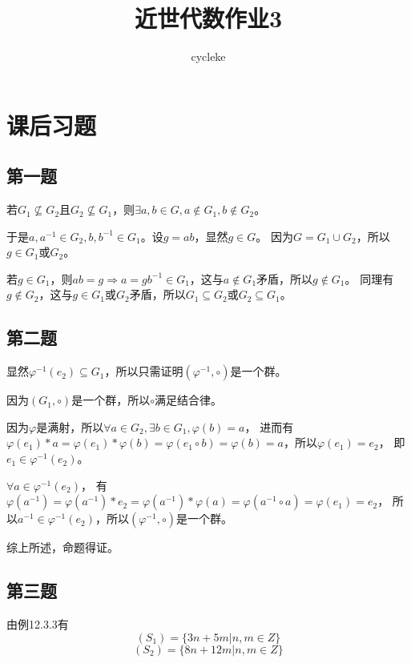 \documentclass[12pt,onecolumn]{article}
\title{近世代数作业3}
\author{cycleke}
\theoremstyle{plain}
\begin{document}
\maketitle
\tableofcontents
\clearpage

\section{课后习题}

\subsection{第一题}
\begin{proof*}
  若$G_1 \nsubseteq G_2$且$G_2 \nsubseteq G_1$，则$\exists a, b \in G, a \notin G_1, b \notin G_2$。

  于是$a, a^{-1}\in G_2, b, b^{-1} \in G_1$。设$g = ab$，显然$g \in G$。
  因为$G = G_1 \cup G_2$，所以$g \in G_1$或$G_2$。

  若$g \in G_1$，则$ab = g \Rightarrow a = gb^{-1} \in G_1$，这与$a \notin G_1$矛盾，所以$g \notin G_1$。
  同理有$g \notin G_2$，这与$g \in G_1$或$G_2$矛盾，所以$G_1 \subseteq G_2$或$G_2 \subseteq G_1$。
\end{proof*}

\subsection{第二题}
\begin{proof*}
  显然$\varphi^{-1}(e_2) \subseteq G_1$，所以只需证明$(\varphi^{-1}, \circ)$是一个群。

  因为$(G_1, \circ)$是一个群，所以$\circ$满足结合律。

  因为$\varphi$是满射，所以$\forall a \in G_2, \exists b \in G_1, \varphi(b) = a$，
  进而有$\varphi(e_1) * a =  \varphi(e_1) * \varphi(b) = \varphi(e_1 \circ b) = \varphi(b) = a$，所以$\varphi(e_1) = e_2$，
  即$e_1 \in \varphi^{-1}(e_2)$。

  $\forall a \in \varphi^{-1}(e_2)$，
  有$\varphi(a^{-1}) = \varphi(a^{-1}) * e_2 = \varphi(a^{-1}) * \varphi(a) = \varphi(a^{-1} \circ a) = \varphi(e_1) = e_2$，
  所以$a^{-1} \in \varphi^{-1}(e_2)$，所以$(\varphi^{-1}, \circ)$是一个群。

  综上所述，命题得证。
\end{proof*}

\subsection{第三题}
由例12.3.3有
\[(S_1) = \{3n + 5m | n, m \in Z\}\]
\[(S_2) = \{8n + 12m | n, m \in Z\}\]
\end{document}
